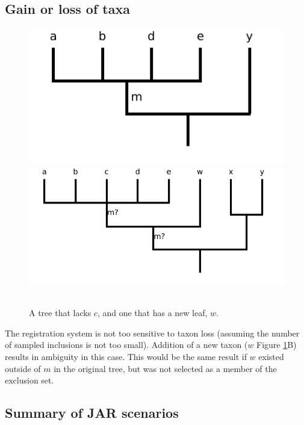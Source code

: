 \documentclass[11pt]{article}
\begin{document}
\subsection{Gain or loss of taxa}
\begin{figure}[h!]
   \centering  \includegraphics[scale=.5]{images/jar-sample-loss.pdf}
   \includegraphics[scale=.5]{images/jar-new-taxon.pdf}\\
   \\
   \caption{A tree that lacks $c$, and one that has a new leaf, $w$.}\label{jarGainLoss}
\end{figure}
The registration system is not too sensitive to taxon loss (assuming the number of sampled inclusions is not too small).
Addition of a new taxon ($w$ Figure \ref{jarGainLoss}B) results in ambiguity in this
  case.
This would be the same result if $w$ existed outside of $m$ in the original tree, but 
  was not selected as a member of the exclusion set.

\subsection{Summary of JAR scenarios}
\end{document}
